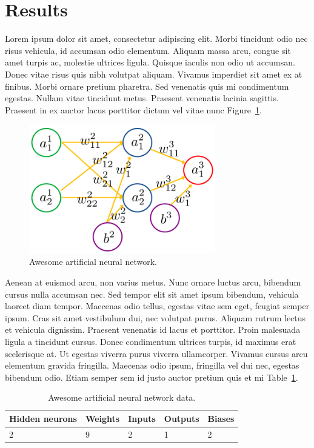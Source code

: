\documentclass[twocolumn]{miniclass}
\begin{document}
\section{Results}
Lorem ipsum dolor sit amet, consectetur adipiscing elit. Morbi tincidunt odio nec risus vehicula, id accumsan odio elementum. Aliquam massa arcu, congue sit amet turpis ac, molestie ultrices ligula. Quisque iaculis non odio ut accumsan. Donec vitae risus quis nibh volutpat aliquam. Vivamus imperdiet sit amet ex at finibus. Morbi ornare pretium pharetra. Sed venenatis quis mi condimentum egestas. Nullam vitae tincidunt metus. Praesent venenatis lacinia sagittis. Praesent in ex auctor lacus porttitor dictum vel vitae nunc Figure~\ref{fig:ann}.


\begin{figure}[]
    \centering
    \includegraphics[width=230pt]{resources/ann.png}
    \caption{Awesome artificial neural network.}
    \label{fig:ann}
\end{figure}

Aenean at euismod arcu, non varius metus. Nunc ornare luctus arcu, bibendum cursus nulla accumsan nec. Sed tempor elit sit amet ipsum bibendum, vehicula laoreet diam tempor. Maecenas odio tellus, egestas vitae sem eget, feugiat semper ipsum. Cras sit amet vestibulum dui, nec volutpat purus. Aliquam rutrum lectus et vehicula dignissim. Praesent venenatis id lacus et porttitor. Proin malesuada ligula a tincidunt cursus. Donec condimentum ultrices turpis, id maximus erat scelerisque at. Ut egestas viverra purus viverra ullamcorper. Vivamus cursus arcu elementum gravida fringilla. Maecenas odio ipsum, fringilla vel dui nec, egestas bibendum odio. Etiam semper sem id justo auctor pretium quis et mi Table~\ref{tab:ann_arch}.

\begin{table}[]
    \centering
    \begin{tabular}{|l|l|l|l|l|}
        \hline
        Hidden neurons & Weights & Inputs & Outputs & Biases \\ \hline
        2              & 9       & 2      & 1       & 2      \\ \hline
    \end{tabular}
    \caption{Awesome artificial neural network data.}
    \label{tab:ann_arch}
\end{table}
\end{document}
